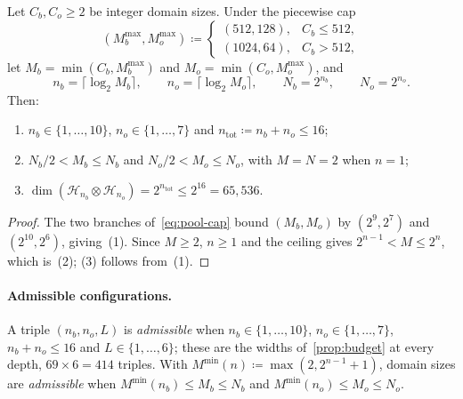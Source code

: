 \documentclass[11pt,a4paper]{article}
\theoremstyle{plain}
\theoremstyle{definition}
\theoremstyle{remark}
\newcommand{\Hil}{\mathcal{H}}
\begin{document}
\begin{proposition}\label{prop:budget}
  Let \( C_b, C_o \ge 2 \) be integer domain sizes. Under the piecewise cap
  \begin{equation}\label{eq:pool-cap}
    (M_b^{\max}, M_o^{\max}) \coloneqq
    \begin{cases}
      (512, 128), & C_b \le 512, \\
      (1024, 64), & C_b > 512,
    \end{cases}
  \end{equation}
  let \( M_b = \min(C_b, M_b^{\max}) \) and \( M_o = \min(C_o, M_o^{\max}) \), and
  \begin{equation}\label{eq:bit-widths}
    n_b = \lceil \log_2 M_b \rceil, \qquad n_o = \lceil \log_2 M_o \rceil, \qquad
    N_b = 2^{n_b}, \qquad N_o = 2^{n_o}.
  \end{equation}
  Then:
  \begin{enumerate}
    \item \( n_b \in \{1, \dots, 10\} \), \( n_o \in \{1, \dots, 7\} \) and
      \( n_{\mathrm{tot}} \coloneqq n_b + n_o \le 16 \);
    \item \( N_b / 2 < M_b \le N_b \) and \( N_o / 2 < M_o \le N_o \), with \( M = N = 2 \) when
      \( n = 1 \);
    \item \( \dim(\Hil_{n_b} \otimes \Hil_{n_o}) = 2^{n_{\mathrm{tot}}} \le 2^{16} = 65{,}536 \).
  \end{enumerate}
\end{proposition}
\begin{proof}
  The two branches of~\eqref{eq:pool-cap} bound \( (M_b, M_o) \) by \( (2^9, 2^7) \) and
  \( (2^{10}, 2^6) \), giving~(1). Since \( M \ge 2 \), \( n \ge 1 \) and the ceiling gives
  \( 2^{n-1} < M \le 2^n \), which is~(2); (3) follows from~(1).
\end{proof}

\paragraph{Admissible configurations.} A triple \( (n_b, n_o, L) \) is \emph{admissible} when
\( n_b \in \{1, \dots, 10\} \), \( n_o \in \{1, \dots, 7\} \), \( n_b + n_o \le 16 \) and
\( L \in \{1, \dots, 6\} \); these are the widths of~\cref{prop:budget} at every depth,
\( 69 \times 6 = 414 \) triples. With \( M^{\min}(n) \coloneqq \max(2, 2^{n-1} + 1) \), domain
sizes are \emph{admissible} when \( M^{\min}(n_b) \le M_b \le N_b \) and
\( M^{\min}(n_o) \le M_o \le N_o \).
\end{document}
